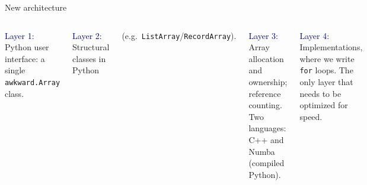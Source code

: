 \documentclass[aspectratio=169]{beamer}
\begin{document}
\begin{frame}{New architecture}
\large
\vspace{0.5 cm}
\begin{columns}
\vspace{-0.2 cm}

\textcolor{darkblue}{Layer 1:} Python user interface: a single \texttt{awkward.Array} class.
\vspace{\baselineskip}

\vspace{0.18 cm}
\textcolor{darkblue}{Layer 2:} Structural classes in Python

(e.g.\ \texttt{ListArray}/\texttt{RecordArray}).
\vspace{\baselineskip}

\vspace{0.18 cm}
\textcolor{darkblue}{Layer 3:} Array allocation and ownership; reference counting. Two languages: C++ and Numba (compiled Python).
\vspace{\baselineskip}

\vspace{0.18 cm}
\textcolor{darkblue}{Layer 4:} Implementations, where we write \texttt{for} loops. The only layer that needs to be optimized for speed.

\includegraphics[width=\linewidth]{awkward-1-0-layers.pdf}
\end{columns}
\end{frame}
\end{document}
